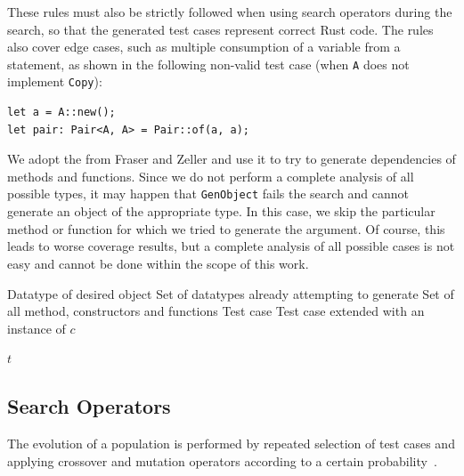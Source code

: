 \documentclass[paper=a4,%
  twoside,%
  BCOR4mm,%
  abstract=true,%
  toc=bibliography,%
  chapterprefix=true,%
  toc=bibliographynumbered,%
  open=right,%
  english,%
  pagesize=pdftex]{scrreprt}
\newcommand{\Desc}[2]{\State \makebox[2em][l]{#1}#2}
\begin{document}
These rules must also be strictly followed when using search operators during the search, so that the generated test cases represent correct Rust code. The rules also cover edge cases, such as multiple consumption of a variable from a statement, as shown in the following non-valid test case (when \texttt{A} does not implement \texttt{Copy}):
\begin{lstlisting}[style=boxed, caption={}]
let a = A::new();
let pair: Pair<A, A> = Pair::of(a, a);
\end{lstlisting}

We adopt the  from Fraser and Zeller and use it to try to generate dependencies of methods and functions. Since we do not perform a complete analysis of all possible types, it may happen that \texttt{GenObject} fails the search and cannot generate an object of the appropriate type. In this case, we skip the particular method or function for which we tried to generate the argument. Of course, this leads to worse coverage results, but a complete analysis of all possible cases is not easy and cannot be done within the scope of this work.

\begin{algorithm}[t]
\caption{$GenObject(c, G, M, t)$}
\label{alg:genobject}
\begin{algorithmic}
\Input
  \Desc{$c$}{Datatype of desired object}
  \Desc{$G$}{Set of datatypes already attempting to generate}
  \Desc{$M$}{Set of all method, constructors and functions}
  \Desc{$t$}{Test case}
\EndInput
\Output
  \Desc{$t$}{Test case extended with an instance of $c$}
\EndOutput
{}

  \EndIf
\EndFor
{}
\State \Return $t$
\end{algorithmic}
\end{algorithm}

\subsection{Search Operators}
\label{sec:search-operators}
The evolution of a population is performed by repeated selection of test cases and applying crossover and mutation operators according to a certain probability~\cite{Fraser2012}.
\end{document}
